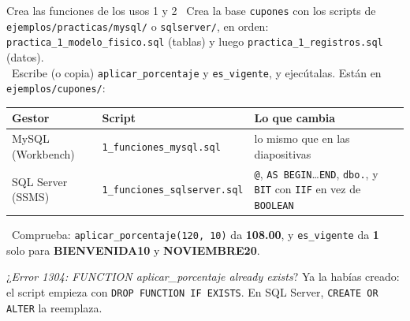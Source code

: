 \documentclass[aspectratio=169,10pt,c]{beamer}
\newcommand{\gris}[1]{\textcolor{utpGris}{#1}}
\newcommand{\ins}[1]{\tikz[baseline=-0.5ex]{\node[rounded corners=2pt,fill=utpRojo,text=white,
  font=\bfseries\scriptsize,inner xsep=5pt,inner ysep=2.5pt] {#1};}}
\newcommand{\npieza}[1]{\tikz[baseline=-0.6ex]{\node[circle,fill=utpRojo,text=white,
  font=\bfseries\scriptsize,inner sep=1.6pt,minimum size=4.2mm] {#1};}}
\begin{document}
\begin{frame}{\ins{Práctica 1} Crea las funciones de los usos 1 y 2}
\npieza{1}\ \small Crea la base \texttt{cupones} con los scripts de \texttt{ejemplos/practicas/mysql/} o \texttt{sqlserver/}, en orden:\\
\hspace*{6.2mm}\texttt{\footnotesize practica\_1\_modelo\_fisico.sql} (tablas) y luego \texttt{\footnotesize practica\_1\_registros.sql} (datos).\\[8pt]
\npieza{2}\ Escribe (o copia) \texttt{aplicar\_porcentaje} y \texttt{es\_vigente}, y ejecútalas. Están en \texttt{ejemplos/cupones/}:
\vspace{0.05cm}
\begin{center}
\footnotesize
\renewcommand{\arraystretch}{1.3}
\begin{tabular}{@{}llp{5.6cm}@{}}
\toprule
\bfseries Gestor & \bfseries Script & \bfseries Lo que cambia \\
\midrule
MySQL (Workbench) & \texttt{1\_funciones\_mysql.sql} & lo mismo que en las diapositivas \\
SQL Server (SSMS) & \texttt{1\_funciones\_sqlserver.sql} & \texttt{@}, \texttt{AS BEGIN}\ldots\texttt{END}, \texttt{dbo.}, y \texttt{BIT} con \texttt{IIF} en vez de \texttt{BOOLEAN} \\
\bottomrule
\end{tabular}
\end{center}
\vspace{0.05cm}
\npieza{3}\ \small Comprueba: \texttt{aplicar\_porcentaje(120, 10)} da \textbf{108.00}, y \texttt{es\_vigente} da \textbf{1}\\
\hspace*{6.2mm}solo para \textbf{BIENVENIDA10} y \textbf{NOVIEMBRE20}.\\[8pt]
\hspace*{6.2mm}\parbox[t]{.93\textwidth}{\footnotesize\gris{¿\textit{Error 1304: FUNCTION aplicar\_porcentaje already exists}? Ya la habías creado: el script empieza con \texttt{DROP FUNCTION IF EXISTS}. En SQL Server, \texttt{CREATE OR ALTER} la reemplaza.}}
\end{frame}
\end{document}
